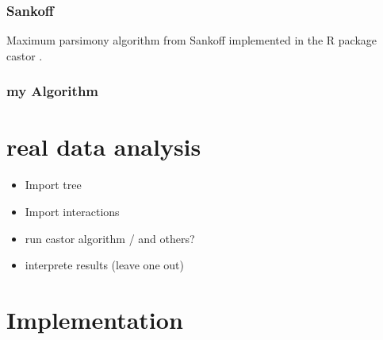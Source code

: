       \subsubsection{Sankoff}
        Maximum parsimony algorithm from Sankoff implemented in the R package castor \cite{Louca2017}.

      \subsubsection{my Algorithm}

  \section{real data analysis}
    \begin{itemize}
      \item Import tree
      \item Import interactions
      \item run castor algorithm / and others?
      \item interprete results (leave one out)
    \end{itemize}

  \section{Implementation}

